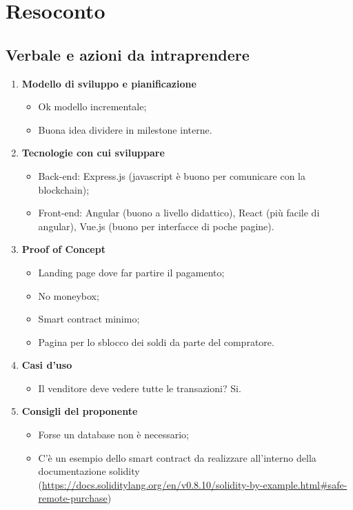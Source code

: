 \section{Resoconto}
\subsection{Verbale e azioni da intraprendere}

\begin{enumerate}
	\item \textbf{Modello di sviluppo e pianificazione}
	\begin{itemize}
		\item Ok modello incrementale;
		\item Buona idea dividere in milestone interne.
	\end{itemize}
	\item \textbf{Tecnologie con cui sviluppare}
	\begin{itemize}
		\item Back-end: Express.js (javascript è buono per comunicare con la blockchain);
		\item Front-end: Angular (buono a livello didattico), React (più facile di angular), Vue.js (buono per interfacce di poche pagine).
	\end{itemize}
	\item \textbf{Proof of Concept}
	\begin{itemize}
		\item Landing page dove far partire il pagamento;
		\item No moneybox;
		\item Smart contract minimo;
		\item Pagina per lo sblocco dei soldi da parte del compratore.
	\end{itemize}
	\item \textbf{Casi d'uso}
	\begin{itemize}
		\item Il venditore deve vedere tutte le transazioni? Si.
	\end{itemize}
	\item \textbf{Consigli del proponente}
	\begin{itemize}
		\item Forse un database non è necessario;
		\item C'è un esempio dello smart contract da realizzare all'interno della documentazione solidity (\url{https://docs.soliditylang.org/en/v0.8.10/solidity-by-example.html#safe-remote-purchase})
	\end{itemize}
\end{enumerate}
\pagebreak


